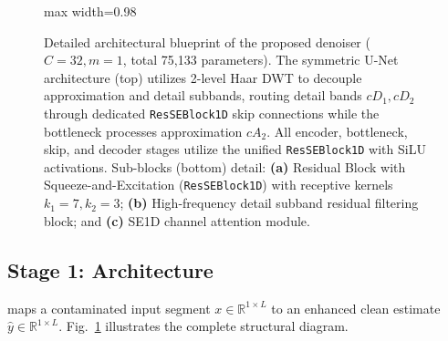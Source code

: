 \begin{figure}[!t]
\begin{adjustbox}{max width=0.98\textwidth}
\end{adjustbox}
\caption{Detailed architectural blueprint of the proposed \HSL{} denoiser ($C=32, m=1$, total 75{,}133 parameters). The symmetric U-Net architecture (top) utilizes 2-level Haar DWT to decouple approximation and detail subbands, routing detail bands $cD_1, cD_2$ through dedicated \texttt{ResSEBlock1D} skip connections while the bottleneck processes approximation $cA_2$. All encoder, bottleneck, skip, and decoder stages utilize the unified \texttt{ResSEBlock1D} with SiLU activations. Sub-blocks (bottom) detail: \textbf{(a)} Residual Block with Squeeze-and-Excitation (\texttt{ResSEBlock1D}) with receptive kernels $k_1=7, k_2=3$; \textbf{(b)} High-frequency detail subband residual filtering block; and \textbf{(c)} SE1D channel attention module.}
\label{fig:haarsymlite}
\end{figure}

\subsection{Stage 1: \HSL{} Architecture}
\label{sec:haarsymlite}
\HSL{} maps a contaminated input segment $x \in \mathbb{R}^{1 \times L}$ to an enhanced clean estimate $\hat{y} \in \mathbb{R}^{1 \times L}$. Fig.~\ref{fig:haarsymlite} illustrates the complete structural diagram.

